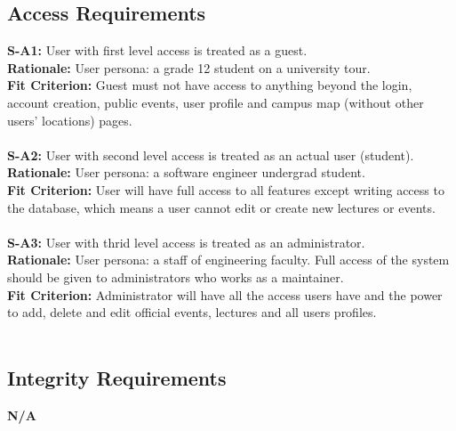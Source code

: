 \documentclass[12pt]{article}
\begin{document}
\subsection{Access Requirements}
  \textbf{S-A1:} User with first level access is treated as a guest.\\
  \textbf{Rationale:} User persona: a grade 12 student on a university tour.\\
  \textbf{Fit Criterion:} Guest must not have access to anything beyond the login, account creation, public events, user profile and campus map (without other users' locations) pages. \\\\
  \textbf{S-A2:} User with second level access is treated as an actual user (student).\\
  \textbf{Rationale:} User persona: a software engineer undergrad student.\\
  \textbf{Fit Criterion:} User will have full access to all features except writing access to the database, which means a user cannot edit or create new lectures or events. \\\\
  \textbf{S-A3:} User with thrid level access is treated as an administrator.\\
  \textbf{Rationale:} User persona: a staff of engineering faculty. Full access of the system should be given to administrators who works as a maintainer.\\
  \textbf{Fit Criterion:} Administrator will have all the access users have and the power to add, delete and edit official events, lectures and all users profiles.\\\\

\subsection{Integrity Requirements}
  \textbf{N/A}\\
\end{document}
